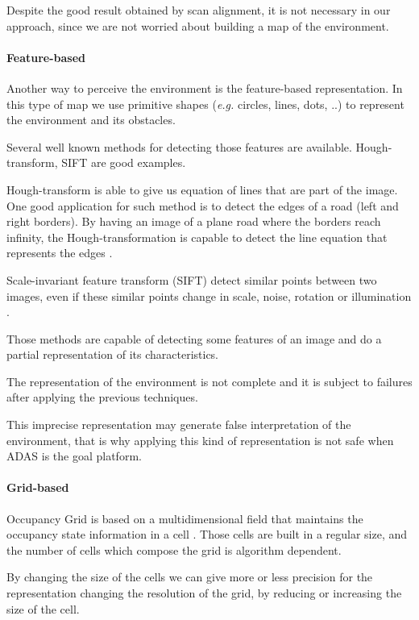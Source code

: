 Despite the good result obtained by scan alignment, it is not necessary in our approach, since we are not worried about building a map of the environment. 

\paragraph{Feature-based}

Another way to perceive the environment is the feature-based representation. In this type of map we use primitive shapes (\textit{e.g.} circles, lines, dots, ..) to represent the environment and its obstacles.

Several well known methods for detecting those features are available. Hough-transform, SIFT are good examples. 

Hough-transform is able to give us equation of lines that are part of the image. One good application for such method is to detect the edges of a road (left and right borders). By having an image of a plane road where the borders reach infinity, the Hough-transformation is capable to detect the line equation that represents the edges \cite{Ballard:1987:GHT:33517.33574}.

Scale-invariant feature transform (SIFT) detect similar points between two images, even if these similar points change in scale, noise, rotation or illumination \cite{Lowe:1999:ORL:850924.851523}.

Those methods are capable of detecting some features of an image and do a partial representation of its characteristics. 

The representation of the environment is not complete and it is subject to failures after applying the previous techniques.

This imprecise representation may generate false interpretation of the environment, that is why applying this kind of representation is not safe when ADAS is the goal platform.

\paragraph{Grid-based}
\label{ch02:gridbased}

Occupancy Grid is based on a multidimensional field that maintains the occupancy state information in a cell \cite{Elfes:1989:UOG:68491.68495}. Those cells are built in a regular size, and the number of cells which compose the grid is algorithm dependent.

By changing the size of the cells we can give more or less precision for the representation changing the resolution of the grid, by reducing or increasing the size of the cell.

